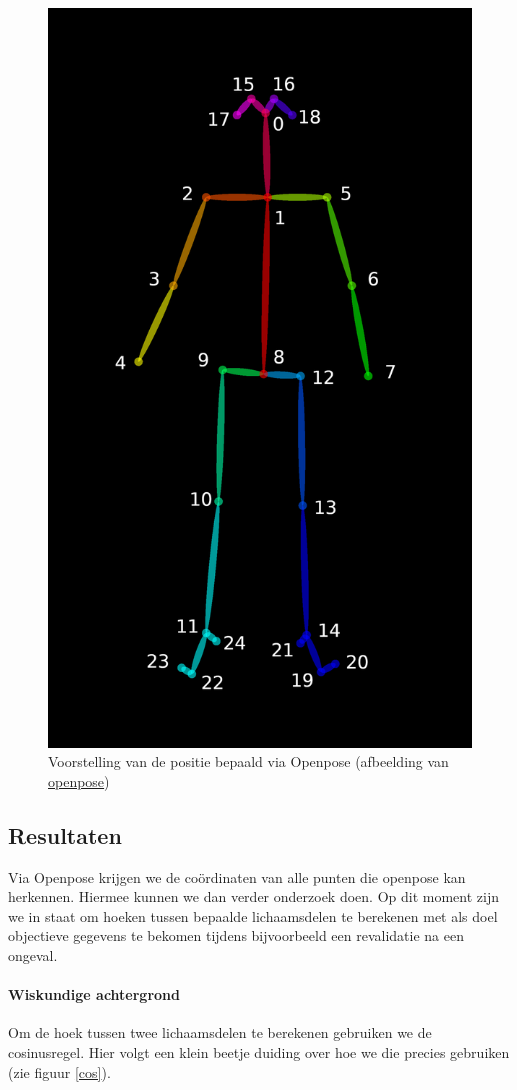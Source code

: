 \documentclass[a4paper,twoside,kulak]{kulakreport}
\begin{document}
\begin{figure}[H]
	\centering
	\includegraphics[width=.5\textwidth]{HPE_skelet}
	\caption{Voorstelling van de positie bepaald via Openpose (afbeelding van \href{https://github.com/CMU-Perceptual-Computing-Lab/openpose/blob/master/doc/output.md}{openpose})}
	\label{fig:skelet}
\end{figure}


\subsection{Resultaten}

Via Openpose krijgen we de coördinaten van alle punten die openpose kan herkennen. Hiermee kunnen we dan verder onderzoek doen. Op dit moment zijn we in staat om hoeken tussen bepaalde lichaamsdelen te berekenen met als doel objectieve gegevens te bekomen tijdens bijvoorbeeld een revalidatie na een ongeval.

\paragraph{Wiskundige achtergrond}
Om de hoek tussen twee lichaamsdelen te berekenen gebruiken we de cosinusregel. Hier volgt een klein beetje duiding over hoe we die precies gebruiken (zie figuur \ref{cos}).\\
\end{document}
